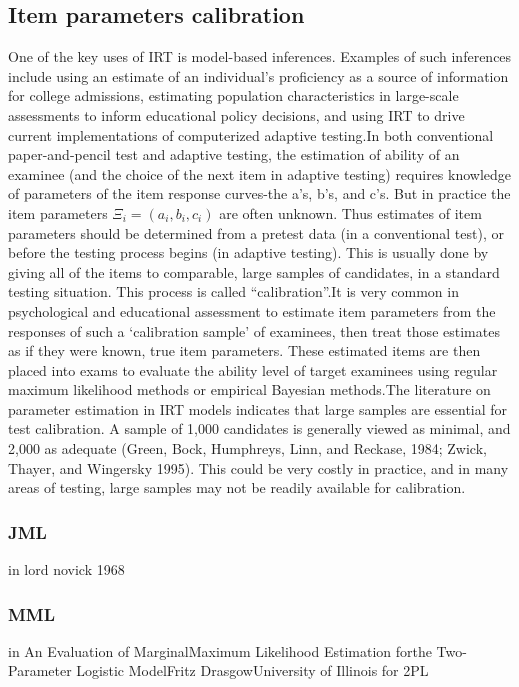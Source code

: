 \subsection{Item parameters calibration}
One of the key uses of IRT is model-based inferences. Examples of such inferences include using an estimate of an individual’s proficiency as a source of information for college admissions, estimating population characteristics in large-scale assessments to
inform educational policy decisions, and using IRT to drive current implementations of computerized adaptive testing.In both conventional paper-and-pencil test and adaptive testing, the estimation of ability of an examinee (and the choice of the next item in adaptive testing) requires knowledge of parameters of the item response curves-the a's, b’s, and c’s. But in practice the item parameters $\Xi_i = (a_i, b_i, c_i)$ are often unknown. Thus estimates of item parameters should be determined from a pretest data (in a conventional test), or before the testing process begins (in adaptive testing). This is usually done by giving all of the items to comparable, large samples of candidates, in a standard testing situation. This process is called “calibration”.It is very common in psychological and educational assessment to estimate item parameters from the responses of such a ‘calibration sample’ of examinees, then treat those estimates as if they were known, true item parameters. These estimated items are then placed into exams to evaluate the ability level of target examinees using regular maximum likelihood methods or empirical Bayesian methods.The literature on parameter estimation in IRT models indicates that large samples are essential for test calibration. A sample of 1,000 candidates is generally viewed as minimal, and 2,000 as adequate (Green, Bock, Humphreys, Linn, and Reckase, 1984; Zwick, Thayer, and Wingersky 1995). This could be very costly in practice, and in many areas of testing, large samples may not be readily available for calibration.
\subsubsection{JML}

in lord novick 1968
\subsubsection{MML}
in An Evaluation of MarginalMaximum Likelihood Estimation forthe Two-Parameter Logistic ModelFritz DrasgowUniversity of Illinois for 2PL
